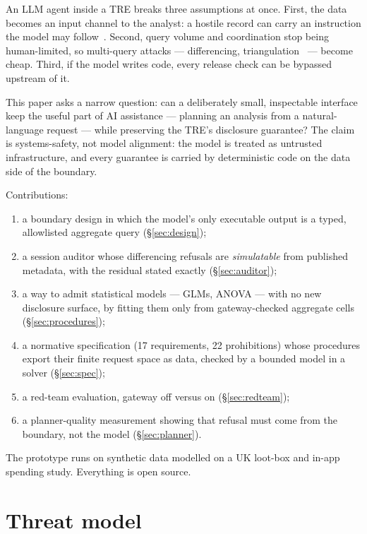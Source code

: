 \documentclass[11pt,a4paper]{article}
\begin{document}
An LLM agent inside a TRE breaks three assumptions at once. First, the data
becomes an input channel to the analyst: a hostile record can carry an
instruction the model may follow~\cite{greshake2023}. Second, query volume and
coordination stop being human-limited, so multi-query attacks --- differencing,
triangulation~\cite{dinur2003} --- become cheap. Third, if the model writes
code, every release check can be bypassed upstream of it.

This paper asks a narrow question: can a deliberately small, inspectable
interface keep the useful part of AI assistance --- planning an analysis from a
natural-language request --- while preserving the TRE's disclosure guarantee?
The claim is systems-safety, not model alignment: the model is treated as
untrusted infrastructure, and every guarantee is carried by deterministic code
on the data side of the boundary.

Contributions:
\begin{enumerate}
  \item a boundary design in which the model's only executable output is a
    typed, allowlisted aggregate query (\S\ref{sec:design});
  \item a session auditor whose differencing refusals are \emph{simulatable}
    from published metadata, with the residual stated exactly
    (\S\ref{sec:auditor});
  \item a way to admit statistical models --- GLMs, ANOVA --- with no new
    disclosure surface, by fitting them only from gateway-checked aggregate
    cells (\S\ref{sec:procedures});
  \item a normative specification (17 requirements, 22 prohibitions) whose
    procedures export their finite request space as data, checked by a bounded
    model in a solver (\S\ref{sec:spec});
  \item a red-team evaluation, gateway off versus on (\S\ref{sec:redteam});
  \item a planner-quality measurement showing that refusal must come from the
    boundary, not the model (\S\ref{sec:planner}).
\end{enumerate}

The prototype runs on synthetic data modelled on a UK loot-box and in-app
spending study. Everything is open source.

\section{Threat model}
\label{sec:threat}
\end{document}
